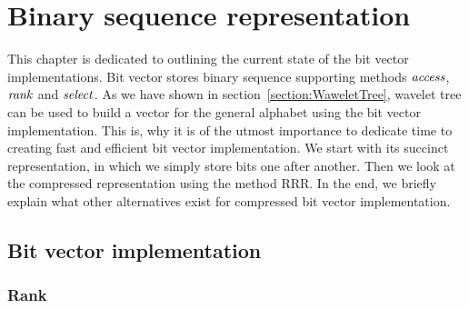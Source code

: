 \chapter{Binary sequence representation}
\label{kap:kap2}

This chapter is dedicated to outlining the current state of the bit vector
implementations. Bit vector stores binary sequence supporting methods $\mathit{access}$,
$\mathit{rank}$ and $\mathit{select}$. As we have shown in section~\ref{section:WaweletTree}, wavelet
tree can be used to build a vector for the general alphabet using the bit vector
implementation. This is, why it is of the utmost importance to dedicate time
to creating fast and efficient bit vector implementation. We start with its
succinct representation, in which we simply store bits one after another. Then we
look at the compressed representation using the method RRR. In the end, we briefly
explain what other alternatives exist for compressed bit vector implementation.

\section{Bit vector implementation}

\subsection{Rank}
\label{section:rank}

